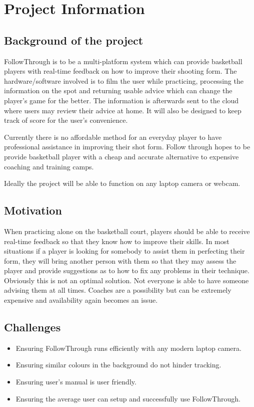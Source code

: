 \chapter{Project Information}

\section{Background of the project}
\hspace*{4mm}FollowThrough is to be a multi-platform system which can provide basketball players with real-time feedback on how to improve their shooting form. The hardware/software involved is to film the user while practicing, processing the information on the spot and returning usable advice which can change the player’s game for the better. The information is afterwards sent to the cloud where users may review their advice at home. It will also be designed to keep track of score for the user’s convenience.

Currently there is no affordable method for an everyday player to have professional assistance in improving their shot form. Follow through hopes to be provide basketball player with a cheap and accurate alternative to expensive coaching and training camps.

Ideally the project will be able to function on any laptop camera or webcam.

\section{Motivation}
\hspace*{4mm}When practicing alone on the basketball court, players should be able to receive real-time feedback so that they know how to improve their skills. In most situations if a player is looking for somebody to assist them in perfecting their form, they will bring another person with them so that they may assess the player and provide suggestions as to how to fix any problems in their technique. Obviously this is not an optimal solution. Not everyone is able to have someone advising them at all times. Coaches are a possibility but can be extremely expensive and availability again becomes an issue.


\section{Challenges}
\begin{itemize}
    \item Ensuring FollowThrough runs efficiently with any modern laptop camera.
    \item Ensuring similar colours in the background do not hinder tracking.
    \item Ensuring user's manual is user friendly.
    \item Ensuring the average user can setup and successfully use FollowThrough.
\end{itemize}

